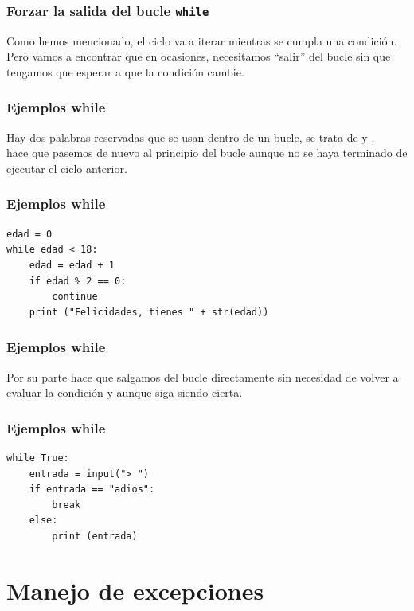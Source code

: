 \begin{frame}
\frametitle{Forzar la salida del bucle \texttt{while}}
Como hemos mencionado, el ciclo  va a iterar mientras se cumpla una condición.
\\
\bigskip
Pero vamos a encontrar que en ocasiones, necesitamos \enquote{salir} del bucle sin que tengamos que esperar a que la condición cambie.
\end{frame}
\begin{frame}[fragile]
\frametitle{Ejemplos while}
Hay dos palabras reservadas que se usan dentro de un bucle, se trata de  y .
\\
\bigskip
{} hace que pasemos de nuevo al principio del bucle aunque no se haya terminado de ejecutar el ciclo anterior.
\end{frame}
\begin{frame}[fragile]
\frametitle{Ejemplos while}
\begin{lstlisting}[caption=Ejemplo con continue, basicstyle=\linespread{1.2}\ttfamily\small, columns=fullflexible]
edad = 0
while edad < 18:
    edad = edad + 1
    if edad % 2 == 0:
        continue
    print ("Felicidades, tienes " + str(edad))
\end{lstlisting}
\end{frame}
\begin{frame}[fragile]
\frametitle{Ejemplos while}
Por su parte  hace que salgamos del bucle  directamente sin necesidad de volver a evaluar la condición y aunque siga siendo cierta.
\end{frame}
\begin{frame}[fragile]
\frametitle{Ejemplos while}
\begin{lstlisting}[caption=Ejemplo con break, basicstyle=\linespread{1.2}\ttfamily\small, columns=fullflexible]
while True:
    entrada = input("> ")
    if entrada == "adios":
        break
    else:
        print (entrada)
\end{lstlisting}
\end{frame}
\section{Manejo de excepciones}
